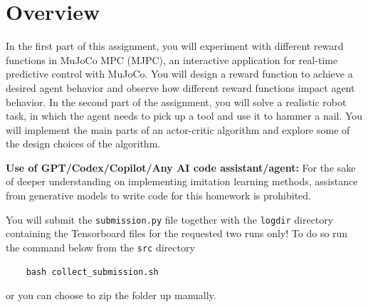 \section{Overview}

In the first part of this assignment, you will experiment with different reward functions in MuJoCo MPC (MJPC), 
an interactive application for real-time predictive control with MuJoCo. You will design a reward function to achieve a desired agent behavior and observe 
how different reward functions impact agent behavior. In the second part of the assignment, you will solve a realistic robot task, 
in which the agent needs to pick up a tool and use it to hammer a nail. You will implement the main parts of an actor-critic algorithm and explore some of the design choices of the algorithm.

\vspace{0.2cm}

\noindent\textbf{Use of GPT/Codex/Copilot/Any AI code assistant/agent:} For the sake of deeper understanding on implementing imitation learning methods, assistance from generative models to write code for this homework is prohibited. 

You will submit the \texttt{submission.py} file together with the \texttt{logdir} directory containing the Tensorboard files for the requested two runs only! To do so run the command  below from the \texttt{src} directory
\begin{verbatim}
    bash collect_submission.sh
\end{verbatim}

or you can choose to zip the folder up manually.

\newpage
